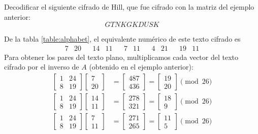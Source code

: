 \begin{examplebox}{}{}
    Decodificar el siguiente cifrado de Hill, que fue cifrado con la matriz del ejemplo anterior:
    $$GTNKGKDUSK$$

    \tcblower
    \solucion De la tabla \ref{table:alphabet}, el equivalente numérico de este texto cifrado es
    $$\begin{array}{cccccccccccccc}
        7 & 20 & & 14 & 11 & & 7 & 11 & & 4 & 21 & & 19 & 11
    \end{array}$$
    Para obtener los pares del texto plano, multiplicamos cada vector del texto cifrado por el inverso de $A$ (obtenido en el ejemplo anterior):
    \begin{align*}
        \begin{bmatrix} 1 & 24 \\ 8 & 19 \end{bmatrix} \begin{bmatrix} 7 \\ 20 \end{bmatrix} & = \begin{bmatrix} 487 \\ 436 \end{bmatrix} = \begin{bmatrix} 19 \\ 20 \end{bmatrix} \pmod{26} \\
        \begin{bmatrix} 1 & 24 \\ 8 & 19 \end{bmatrix} \begin{bmatrix} 14 \\ 11 \end{bmatrix} & = \begin{bmatrix} 278 \\ 321 \end{bmatrix} = \begin{bmatrix} 18 \\ 9 \end{bmatrix} \pmod{26} \\
        \begin{bmatrix} 1 & 24 \\ 8 & 19 \end{bmatrix} \begin{bmatrix} 7 \\ 11 \end{bmatrix} & = \begin{bmatrix} 271 \\ 265 \end{bmatrix} = \begin{bmatrix} 11 \\ 5 \end{bmatrix} \pmod{26} \\

\end{align*}
\end{examplebox}
